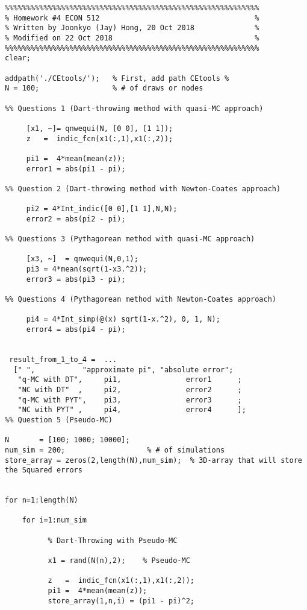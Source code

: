 \documentclass[10pt, letterpaper]{article}
\begin{document}
\begin{verbatim}
%%%%%%%%%%%%%%%%%%%%%%%%%%%%%%%%%%%%%%%%%%%%%%%%%%%%%%%%%%%
% Homework #4 ECON 512                                    %
% Written by Joonkyo (Jay) Hong, 20 Oct 2018              %
% Modified on 22 Oct 2018                                 %
%%%%%%%%%%%%%%%%%%%%%%%%%%%%%%%%%%%%%%%%%%%%%%%%%%%%%%%%%%%
clear;

addpath('./CEtools/');   % First, add path CEtools %
N = 100;                 % # of draws or nodes 

%% Questions 1 (Dart-throwing method with quasi-MC approach)

     [x1, ~]= qnwequi(N, [0 0], [1 1]);
     z   =  indic_fcn(x1(:,1),x1(:,2));
     
     pi1 =  4*mean(mean(z));
     error1 = abs(pi1 - pi);
     
%% Question 2 (Dart-throwing method with Newton-Coates approach)
 
     pi2 = 4*Int_indic([0 0],[1 1],N,N);     
     error2 = abs(pi2 - pi);

%% Questions 3 (Pythagorean method with quasi-MC approach)

     [x3, ~]  = qnwequi(N,0,1);
     pi3 = 4*mean(sqrt(1-x3.^2));
     error3 = abs(pi3 - pi);
     
%% Questions 4 (Pythagorean method with Newton-Coates approach)

     pi4 = 4*Int_simp(@(x) sqrt(1-x.^2), 0, 1, N);
     error4 = abs(pi4 - pi);
     
     
 result_from_1_to_4 =  ...
  [" ",           "approximate pi", "absolute error";
   "q-MC with DT",     pi1,               error1      ;
   "NC with DT"  ,     pi2,               error2      ;
   "q-MC with PYT",    pi3,               error3      ;
   "NC with PYT" ,     pi4,               error4      ];
%% Question 5 (Pseudo-MC)

N       = [100; 1000; 10000]; 
num_sim = 200;                   % # of simulations
store_array = zeros(2,length(N),num_sim);  % 3D-array that will store the Squared errors


for n=1:length(N)   
            
    for i=1:num_sim
        
          % Dart-Throwing with Pseudo-MC
        
          x1 = rand(N(n),2);    % Pseudo-MC 
         
          z   =  indic_fcn(x1(:,1),x1(:,2));
          pi1 =  4*mean(mean(z));
          store_array(1,n,i) = (pi1 - pi)^2;        
                    

\end{verbatim}
\end{document}

